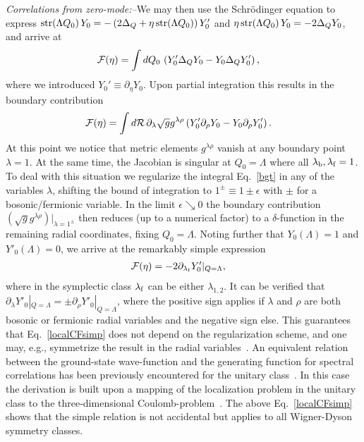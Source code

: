 \documentclass[twocolumn,showpacs,aps,prl]{revtex4}
\begin{document}
{\it Correlations from zero-mode:--}We may then use the Schr\"odinger equation 
to express
${\rm str}(\Lambda Q_0)\, Y_0
=-
\left(2
\Delta_Q +\eta \, {\rm str}(\Lambda Q_0)
\right)
Y'_0
$
and 
$\eta\, {\rm str}(\Lambda Q_0)\, Y_0
=-
2\Delta_QY_0$, and
arrive at
\begin{align}
\label{localCFQ1}
{\cal F}(\eta)
&= 
\int dQ_0\, 
\left(
Y'_0 
\Delta_Q
Y_0 
-
Y_0 
\Delta_Q
Y'_0 
\right),
\end{align}
where we introduced $Y_0'\equiv \partial_\eta Y_0$.
Upon partial integration this results in 
the boundary contribution
\begin{align}
\label{bgt}
{\cal F}(\eta)
&=
\int d{\cal R} \,
\partial_\lambda
 \sqrt{g} g^{\lambda\rho}
 \left( 
Y_0' 
\partial_\rho  Y_0
-
Y_0 
\partial_\rho  Y'_0
 \right).
\end{align}
At this point we notice that  
metric elements $g^{\lambda\rho}$ vanish at any 
boundary point $\lambda=1$. At the same time, the Jacobian is singular 
at $Q_0=\Lambda$ where all $\lambda_{\rm b},\lambda_{\rm f}=1$. 
To deal with this situation we regularize the integral Eq.~\eqref{bgt} 
in any of the variables $\lambda$, shifting the bound of integration to
$1^\pm\equiv1\pm\epsilon$ with $\pm$ for a bosonic/fermionic variable.
In the limit $\epsilon \searrow 0$ 
the boundary contribution 
$(\sqrt{g} g^{\lambda\rho})|_{\lambda=1^\pm}$ 
then reduces (up to a numerical factor) 
to a $\delta$-function 
 in the remaining radial coordinates, fixing $Q_0=\Lambda$. 
Noting further that 
$Y_0(\Lambda)=1$ and $Y'_0(\Lambda)=0$, we arrive at 
the remarkably simple expression
\begin{align} 
\label{localCFsimp}
{\cal F}(\eta)
&=  
-2\partial_{\lambda_{\rm f}}
Y'_0|_{Q=\Lambda},
\end{align}
where in the symplectic class $\lambda_{\rm f}$ can be either $\lambda_{1,2}$.
It can be verified that 
$\partial_{\lambda}Y'_0|_{Q=\Lambda}=\pm \partial_{\rho}Y'_0|_{Q=\Lambda}$,
where the positive sign applies if $\lambda$ and $\rho$ are both bosonic or fermionic
radial variables and the negative sign else. This guarantees that 
Eq.~\eqref{localCFsimp} does not depend on the regularization scheme, 
and
one may, e.g., symmetrize the result in the radial variables~\cite{SuppMat}.  
An equivalent relation
between the ground-state wave-function and the generating function for 
spectral correlations has been previously encountered
for the unitary class~\cite{TMLevel-Level,crr}. 
In this case the derivation is built upon a mapping of the localization  
problem in the unitary class to the three-dimensional Coulomb-problem~\cite{Skvortsov}. 
The above Eq.~\eqref{localCFsimp} shows 
that the simple relation is not accidental but applies to all Wigner-Dyson symmetry classes. 
\end{document}
